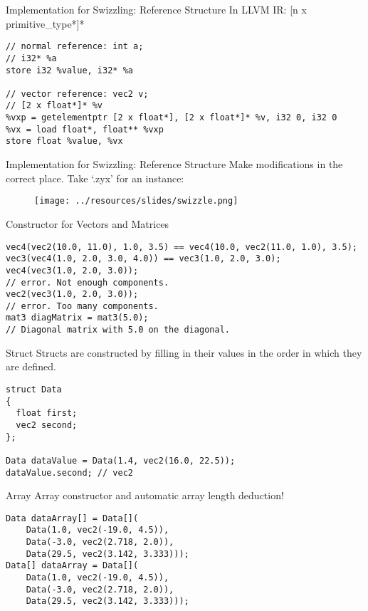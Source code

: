 \begin{frame}[fragile]{Implementation for Swizzling: Reference Structure}
    In LLVM IR: [n x primitive\_type*]*
    \begin{lstlisting}
// normal reference: int a;
// i32* %a
store i32 %value, i32* %a

// vector reference: vec2 v;
// [2 x float*]* %v
%vxp = getelementptr [2 x float*], [2 x float*]* %v, i32 0, i32 0
%vx = load float*, float** %vxp
store float %value, %vx
    \end{lstlisting}
\end{frame}

\begin{frame}{Implementation for Swizzling: Reference Structure}
    Make modifications in the correct place. Take `.zyx' for an instance:
    \begin{figure}
        \texttt{[image: ../resources/slides/swizzle.png]}
    \end{figure}
\end{frame}

\begin{frame}[fragile]{Constructor for Vectors and Matrices}
    \begin{lstlisting}
vec4(vec2(10.0, 11.0), 1.0, 3.5) == vec4(10.0, vec2(11.0, 1.0), 3.5);
vec3(vec4(1.0, 2.0, 3.0, 4.0)) == vec3(1.0, 2.0, 3.0);
vec4(vec3(1.0, 2.0, 3.0)); 
// error. Not enough components.
vec2(vec3(1.0, 2.0, 3.0)); 
// error. Too many components.
mat3 diagMatrix = mat3(5.0);
// Diagonal matrix with 5.0 on the diagonal.
    \end{lstlisting}
\end{frame}

\begin{frame}[fragile]{Struct}
    Structs are constructed by filling in their values 
    in the order in which they are defined.
    \begin{lstlisting}
struct Data
{
  float first;
  vec2 second;
};

Data dataValue = Data(1.4, vec2(16.0, 22.5));
dataValue.second; // vec2    
    \end{lstlisting}
\end{frame}

\begin{frame}[fragile]{Array}
    Array constructor and automatic array length deduction!
    \begin{lstlisting}
Data dataArray[] = Data[](
    Data(1.0, vec2(-19.0, 4.5)),
    Data(-3.0, vec2(2.718, 2.0)),
    Data(29.5, vec2(3.142, 3.333)));
Data[] dataArray = Data[](
    Data(1.0, vec2(-19.0, 4.5)),
    Data(-3.0, vec2(2.718, 2.0)),
    Data(29.5, vec2(3.142, 3.333))); 
    \end{lstlisting}
\end{frame}